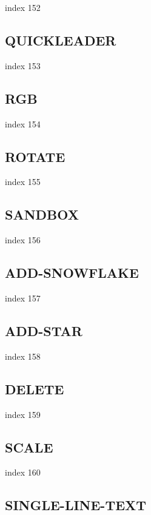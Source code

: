 \documentclass[11pt]{report}
\begin{document}
index 152

\subsection{QUICKLEADER}

index 153

\subsection{RGB}

 index 154

\subsection{ROTATE}

index 155

\subsection{SANDBOX}

index 156

\subsection{ADD-SNOWFLAKE}

index 157

\subsection{ADD-STAR}

index 158

\subsection{DELETE}

index 159

\subsection{SCALE}

index 160

\subsection{SINGLE-LINE-TEXT}
\end{document}
